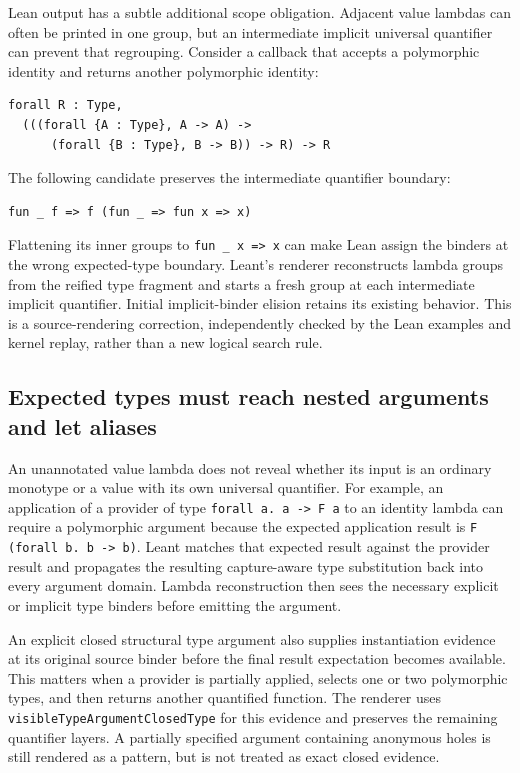 \documentclass[11pt]{article}
\newcommand{\code}[1]{\texttt{#1}}
\begin{document}
Lean output has a subtle additional scope obligation. Adjacent value lambdas
can often be printed in one group, but an intermediate implicit universal
quantifier can prevent that regrouping. Consider a callback that accepts a
polymorphic identity and returns another polymorphic identity:
\begin{lstlisting}
forall R : Type,
  (((forall {A : Type}, A -> A) ->
      (forall {B : Type}, B -> B)) -> R) -> R
\end{lstlisting}
The following candidate preserves the intermediate quantifier boundary:
\begin{lstlisting}
fun _ f => f (fun _ => fun x => x)
\end{lstlisting}
Flattening its inner groups to \code{fun \_ x => x} can make Lean assign the
binders at the wrong expected-type boundary. Leant's renderer reconstructs
lambda groups from the reified type fragment and starts a fresh group at each
intermediate implicit quantifier. Initial implicit-binder elision retains its
existing behavior. This is a source-rendering correction, independently
checked by the Lean examples and kernel replay, rather than a new logical
search rule.

\subsection{Expected types must reach nested arguments and let aliases}

An unannotated value lambda does not reveal whether its input is an ordinary
monotype or a value with its own universal quantifier. For example, an
application of a provider of type \code{forall a. a -> F a} to an identity
lambda can require a polymorphic argument because the expected application
result is \code{F (forall b. b -> b)}. Leant matches that expected result
against the provider result and propagates the resulting capture-aware type
substitution back into every argument domain. Lambda reconstruction then sees
the necessary explicit or implicit type binders before emitting the argument.

An explicit closed structural type argument also supplies instantiation
evidence at its original source binder before the final result expectation
becomes available. This matters when a provider is partially applied, selects
one or two polymorphic types, and then returns another quantified function.
The renderer uses \code{visibleTypeArgumentClosedType} for this evidence and
preserves the remaining quantifier layers. A partially specified argument
containing anonymous holes is still rendered as a pattern, but is not treated
as exact closed evidence.
\end{document}
